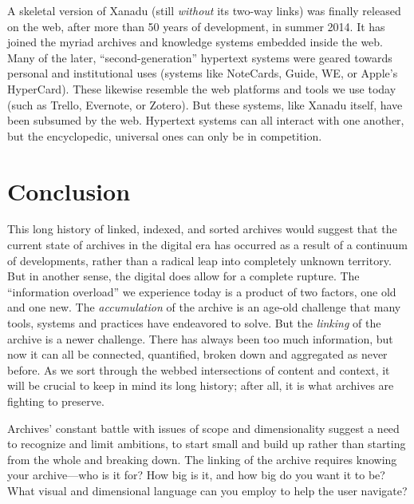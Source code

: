 A skeletal version of Xanadu (still \emph{without} its two-way links) was finally released on the web, after more than 50 years of development, in summer 2014.\autocite{carmody_pioneering_2014,hern_worlds_2014} It has joined the myriad archives and knowledge systems embedded inside the web. Many of the later, ``second-generation'' hypertext systems were geared towards personal and institutional uses (systems like NoteCards, Guide, WE, or Apple's HyperCard).\autocite{halasz_reflections_1988} These likewise resemble the web platforms and tools we use today (such as Trello, Evernote, or Zotero). But these systems, like Xanadu itself, have been subsumed by the web. Hypertext systems can all interact with one another, but the encyclopedic, universal ones can only be in competition.

\section{Conclusion}

This long history of linked, indexed, and sorted archives would suggest that the current state of archives in the digital era has occurred as a result of a continuum of developments, rather than a radical leap into completely unknown territory. But in another sense, the digital does allow for a complete rupture. The ``information overload'' we experience today is a product of two factors, one old and one new. The \emph{accumulation} of the archive is an age-old challenge that many tools, systems and practices have endeavored to solve. But the \emph{linking} of the archive is a newer challenge. There has always been too much information, but now it can all be connected, quantified, broken down and aggregated as never before. As we sort through the webbed intersections of content and context, it will be crucial to keep in mind its long history; after all, it is what archives are fighting to preserve.

Archives' constant battle with issues of scope and dimensionality suggest a need to recognize and limit ambitions, to start small and build up rather than starting from the whole and breaking down. The linking of the archive requires knowing your archive---who is it for? How big is it, and how big do you want it to be? What visual and dimensional language can you employ to help the user navigate?

